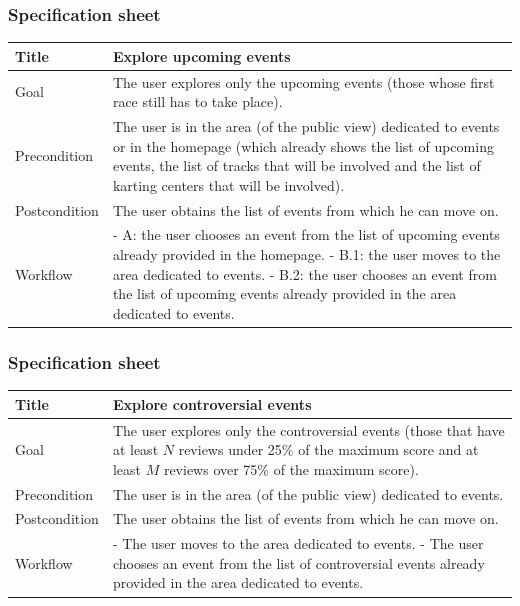 \documentclass{beamer}
\begin{document}
\begin{frame}
    \frametitle{Specification sheet}
    \begin{table}
        \tiny
        \begin{tabular}{|p{2cm}|p{6cm}|}
        \hline
        Title & \textbf{Explore upcoming events} \\
        \hline
        Goal & The user explores only the upcoming events (those whose first race still has to take place). \\
        \hline
        Precondition & The user is in the area (of the public view) dedicated to events or in the homepage (which 
        already shows the list of upcoming events, the list of tracks that will be involved and the list of 
        karting centers that will be involved). \\
        \hline
        Postcondition & The user obtains the list of events from which he can move on.\\
        \hline
        Workflow &
        - A: the user chooses an event from the list of upcoming events already provided in the homepage.\newline
        - B.1: the user moves to the area dedicated to events. \newline
        - B.2: the user chooses an event from the list of upcoming events already provided in the area dedicated
        to events. \\
        \hline
        \end{tabular}
\end{table}
\end{frame}

\begin{frame}
    \frametitle{Specification sheet}
    \begin{table}
        \tiny
        \begin{tabular}{|p{2cm}|p{6cm}|}
        \hline
        Title & \textbf{Explore controversial events} \\
        \hline
        Goal & The user explores only the controversial events (those that have at least $N$ reviews under 25\% of the maximum score
        and at least $M$ reviews over 75\% of the maximum score). \\
        \hline
        Precondition & The user is in the area (of the public view) dedicated to events.\\
        \hline
        Postcondition & The user obtains the list of events from which he can move on.\\
        \hline
        Workflow &
        - The user moves to the area dedicated to events. \newline
        - The user chooses an event from the list of controversial events already provided in the area dedicated to events. \\
        \hline
        \end{tabular}
\end{table}
\end{frame}
\end{document}
